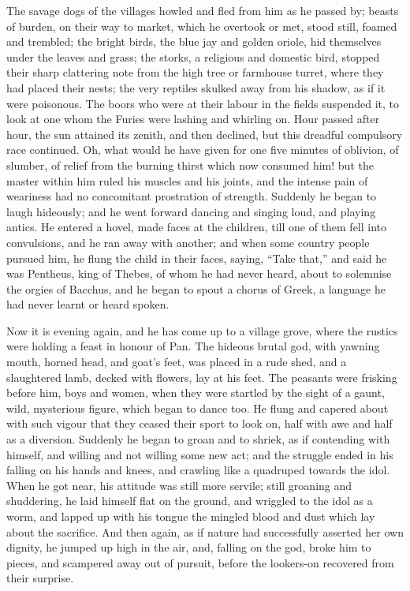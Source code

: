 The savage dogs of the villages howled and fled from him as he
passed by; beasts of burden, on their way to market, which he overtook
or met, stood still, foamed and trembled; the bright birds, the blue
jay and golden oriole, hid themselves under the leaves and grass; the
storks, a religious and domestic bird, stopped their sharp clattering
note from the high tree or farmhouse turret, where they had placed
their nests; the very reptiles skulked away from his shadow, as if it
were poisonous. The boors who were at their labour in the fields
suspended it, to look at one whom the Furies were lashing and whirling
on. Hour passed after hour, the sun attained its zenith, and then
declined, but this dreadful compulsory race continued. Oh, what would
he have given for one five minutes of oblivion, of slumber, of relief
from the burning thirst which now consumed him! but the master within
him ruled his muscles and his joints, and the intense pain of
weariness had no concomitant prostration of strength. Suddenly he
began to laugh hideously; and he went forward dancing and singing
loud, and playing antics. He entered a hovel, made faces at the
children, till one of them fell into convulsions, and he ran away with
another; and when some country people pursued him, he flung the child
in their faces, saying, ``Take that,'' and said he was
Pentheus, king of Thebes, of whom he had never heard, about to
solemnise the orgies of Bacchus, and he began to spout a chorus of
Greek, a language he had never learnt or heard spoken.

Now it is evening again, and he has come up to a village grove,
where the rustics were holding a feast in honour of Pan. The hideous
brutal god, with yawning mouth, horned head, and goat's feet, was
placed in a rude shed, and a slaughtered lamb, decked with flowers,
lay at his feet. The peasants were frisking before him, boys and
women, when they were startled by the sight of a gaunt, wild,
mysterious figure, which began to dance too. He flung and capered
about with such vigour that they ceased their sport to look on, half
with awe and half as a diversion. Suddenly he began to groan and to
shriek, as if contending with himself, and willing and not willing
some new act; and the struggle ended in his falling on his hands and
knees, and crawling like a quadruped towards the idol. When he got
near, his attitude was still more servile; still groaning and
shuddering, he laid himself flat on the ground, and wriggled to the
idol as a worm, and lapped up with his tongue the mingled blood and
dust which lay about the sacrifice. And then again, as if nature had
successfully asserted her own dignity, he jumped up high in the
air, and, falling on the god, broke him to pieces, and scampered away
out of pursuit, before the lookers-on recovered from their surprise.

